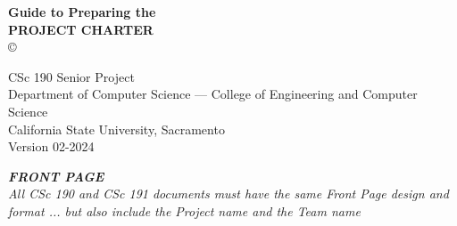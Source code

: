 \begin{tcolorbox}[
    colback = white,
    sharpish corners
]
    \setlength{\parskip}{\baselineskip}
    \setlength{\parindent}{0pt}
    
    \noindent
    \centering
    {
        \bfseries
        Guide to Preparing the      \\
        \uppercase{Project Charter}
    }
    \\
    {\copyright} \PreparerName

    CSc 190 Senior Project                      \\
    Department of Computer Science ---
    College of Engineering and Computer Science \\
    California State University, Sacramento     \\
    Version 02-2024


    {
        \bfseries
        \itshape
        \uppercase{Front Page}
    }
    \\
    {
        \itshape
        All CSc 190 and CSc 191 documents must have the same Front Page design and
        format ... but also include the Project name and the Team name
    }
\end{tcolorbox}